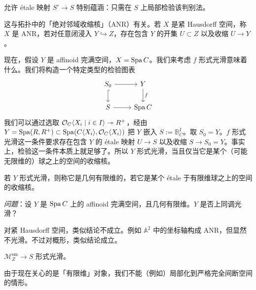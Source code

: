 \begin{remark}
允许 étale 映射 $S'\to S$ 特别蕴涵：只需在 $S$ 上局部检验该判别法。
\end{remark}

\begin{remark}
这与拓扑中的「绝对邻域收缩核」（ANR）有关。若 $X$ 是紧 Hausdorff 空间，称 $X$ 是 ANR，若对任意闭浸入 $Y\hookrightarrow Z$，存在包含 $Y$ 的开集 $U\subset Z$ 以及收缩 $U\to Y$。
\end{remark}

现在，假设 $Y$ 是 affinoid 完满空间，$X=\operatorname{Spa} C$。我们来考虑 $f$ 形式光滑意味着什么。我们将构造一个特定类型的检验图表
\[
\begin{tikzcd}
S_0 \arrow[r] \arrow[d, hook] & Y \arrow[d, "f"] \\
S \arrow[r] & \Spa C
\end{tikzcd}
\]
我们可以通过选取 $\mathcal{O}_C\langle X_i\mid i\in I\rangle\twoheadrightarrow R^+$，经由 $Y=\operatorname{Spa}(R,R^+)\subset\operatorname{Spa}(C\langle X_i\rangle,\mathcal{O}_C\langle X_i\rangle)$ 把 $Y$ 嵌入 $S:=\mathbb{B}^I_C$。取 $S_0=Y$。$f$ 形式光滑这一条件要求存在包含 $Y$ 的 étale 映射 $U\to S$ 以及收缩 $S\to S_0=Y$。事实上，检验这一条件本质上就足够了。所以 $Y$ 形式光滑，当且仅当它是某个（可能无限维的）球之上的空间的收缩核。

\begin{definition}
若 $Y$ 形式光滑，则称它是几何有限维的，若它是某个 étale 于有限维球之上的空间的收缩核。
\end{definition}

\emph{问题}：设 $Y$ 是 $\operatorname{Spa} C$ 上的 affinoid 完满空间，且几何有限维。$Y$ 是否上同调光滑？

\begin{remark}
对紧 Hausdorff 空间，类似结论不成立。例如 $\mathbb{A}^2$ 中的坐标轴构成 ANR，但显然不光滑。不过对概形，类似结论成立。
\end{remark}

\begin{theorem}
$\mathcal{M}^{\mathrm{sm}}_Z\to S$ 形式光滑。
\end{theorem}

\begin{remark}
由于现在关心的是「有限维」对象，我们不能（例如）局部化到严格完全间断空间的情形。
\end{remark}


